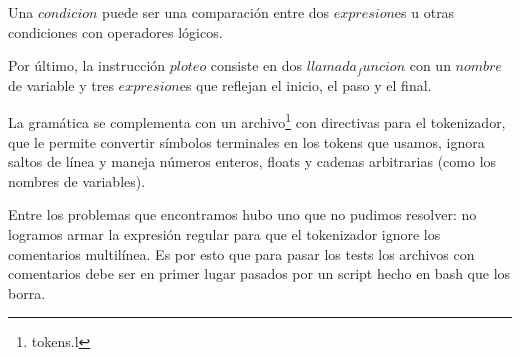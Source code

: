 Una $condicion$ puede ser una comparación entre dos $expresion$es u otras condiciones con operadores lógicos.

Por último, la instrucción $ploteo$ consiste en dos $llamada_funcion$ con un $nombre$ de variable y tres $expresion$es que reflejan el inicio, el paso y el final.

La gramática se complementa con un archivo\footnote{tokens.l} con directivas para el tokenizador, que le permite convertir símbolos terminales en los tokens que usamos, ignora saltos de línea y maneja números enteros, floats y cadenas arbitrarias (como los nombres de variables).

Entre los problemas que encontramos hubo uno que no pudimos resolver: no logramos armar la expresión regular para que el tokenizador ignore los comentarios multilínea. Es por esto que para pasar los tests los archivos con comentarios debe ser en primer lugar pasados por un script hecho en bash que los borra.